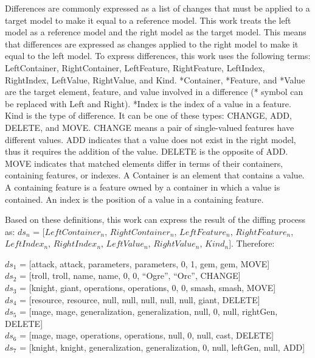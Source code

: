 Differences are commonly expressed as a list of changes that must be applied to a target model to make it equal to a reference model. This work treats the left model as a reference model and the right model as the target model. This means that differences are expressed as changes applied to the right model to make it equal to the left model. To express differences, this work uses the following terms: \textsf{LeftContainer}, \textsf{RightContainer}, \textsf{LeftFeature}, \textsf{RightFeature}, \textsf{LeftIndex}, \textsf{RightIndex}, \textsf{LeftValue}, \textsf{RightValue}, and \textsf{Kind}. \textsf{*Container}, \textsf{*Feature}, and \textsf{*Value} are the target element, feature, and value involved in a difference (\textsf{*} symbol can be replaced with \textsf{Left} and \textsf{Right}). \textsf{*Index} is the index of a value in a feature. \textsf{Kind} is the type of difference. It can be one of these types: \textsf{CHANGE}, \textsf{ADD}, \textsf{DELETE}, and \textsf{MOVE}. \textsf{CHANGE} means a pair of single-valued features have different values. \textsf{ADD} indicates that a value does not exist in the right model, thus it requires the addition of the value. \textsf{DELETE} is the opposite of \textsf{ADD}. \textsf{MOVE} indicates that matched elements differ in terms of their containers, containing features, or indexes. A Container is an element that contains a value. A containing feature is a feature owned by a container in which a value is contained. An index is the position of a value in a containing feature.

Based on these definitions, this work can express the result of the diffing process as: $ds_{n}$ = [$LeftContainer_n$, $RightContainer_n$, $LeftFeature_n$, $RightFeature_n$, $LeftIndex_n$, $RightIndex_n$, $LeftValue_n$, $RightValue_n$, $Kind_n$]. Therefore:

$ds_{1}$ = [\textsf{attack}, \textsf{attack}, \textsf{parameters}, \textsf{parameters}, 0, 1, \textsf{gem}, \textsf{gem}, \textsf{MOVE}]\\
$ds_{2}$ = [\textsf{troll}, \textsf{troll}, \textsf{name}, \textsf{name}, 0, 0, “Ogre”, “Orc”, \textsf{CHANGE}]\\
$ds_{3}$ = [\textsf{knight}, \textsf{giant}, \textsf{operations}, \textsf{operations}, 0, 0, \textsf{smash}, \textsf{smash}, \textsf{MOVE}]\\
$ds_{4}$ = [\textsf{resource}, \textsf{resource}, \textsf{null}, \textsf{null}, \textsf{null}, \textsf{null}, \textsf{null}, \textsf{giant}, \textsf{DELETE}]\\
$ds_{5}$ = [\textsf{mage}, \textsf{mage}, \textsf{generalization}, \textsf{generalization}, \textsf{null}, 0, \textsf{null}, \textsf{rightGen}, \textsf{DELETE}] \\
$ds_{6}$ = [\textsf{mage}, \textsf{mage}, \textsf{operations}, \textsf{operations}, \textsf{null}, 0, \textsf{null}, \textsf{cast}, \textsf{DELETE}]\\
$ds_{7}$ = [\textsf{knight}, \textsf{knight}, \textsf{generalization}, \textsf{generalization}, 0, \textsf{null}, \textsf{leftGen}, \textsf{null}, \textsf{ADD}]

